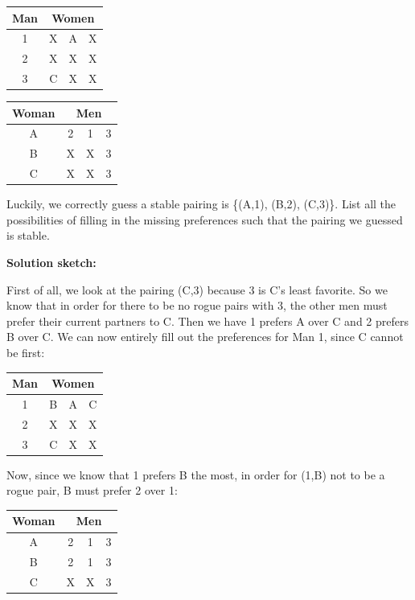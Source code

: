 \documentclass[11pt]{article}
\newif\ifsolutions
\newcommand{\sketch}{\textbf{Solution sketch:}}
\begin{document}
\begin{qunlist}
\begin{itemize}
\begin{center}
\begin{tabular}{|c|ccc|}\hline 
Man&\multicolumn{3}{|c|}{Women}\\\hline 
1&X&A&X\\\hline 
2&X&X&X\\\hline 
3&C&X&X\\\hline
\end{tabular} 
\hspace{2cm}
\begin{tabular}{|c|ccc|}\hline 
Woman&\multicolumn{3}{|c|}{Men}\\\hline 
A&2&1&3\\\hline 
B&X&X&3\\\hline 
C&X&X&3\\\hline
\end{tabular}
\end{center}
        
Luckily, we correctly guess a stable pairing is \{(A,1), (B,2), (C,3)\}. 
List all the possibilities of filling in the missing preferences such that the pairing we guessed is stable.

\ifsolutions
\sketch

First of all, we look at the pairing (C,3) because 3 is C's least favorite. So we know that in order for there to be no rogue pairs with 3, the other men must prefer their current partners to C. Then we have 1 prefers A over C and 2 prefers B over C. We can now entirely fill out the preferences for Man 1, since C cannot be first:

\begin{center}
\begin{tabular}{|c|ccc|}\hline 
Man&\multicolumn{3}{|c|}{Women}\\\hline 
1&B&A&C\\\hline 
2&X&X&X\\\hline 
3&C&X&X\\\hline
\end{tabular} 
\end{center}

Now, since we know that 1 prefers B the most, in order for (1,B) not to be a rogue pair, B must prefer 2 over 1:

\begin{center}
\begin{tabular}{|c|ccc|}\hline 
Woman&\multicolumn{3}{|c|}{Men}\\\hline 
A&2&1&3\\\hline 
B&2&1&3\\\hline 
C&X&X&3\\\hline
\end{tabular}
\end{center}


\end{itemize}
\end{qunlist}
\end{document}
